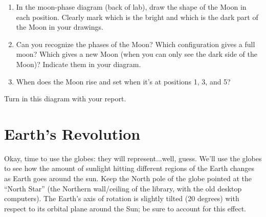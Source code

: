 \documentclass[11pt]{article}%
\begin{document}
\begin{enumerate}
    \item In the moon-phase diagram (back of lab), draw the shape of the Moon in each position. Clearly mark which is the bright and which is the dark part of the Moon in your drawings.
    \item Can you recognize the phases of the Moon? Which configuration gives a full moon? Which gives a new Moon (when you can only see the dark side of the Moon)? Indicate them in your diagram.
    \item When does the Moon rise and set when it's at positions 1, 3, and 5?
\end{enumerate}
Turn in this diagram with your report.

\section{Earth's Revolution}
Okay, time to use the globes: they will represent...well, guess. We'll use the globes to see how the amount of sunlight hitting different regions of the Earth changes as Earth goes around the sun. Keep the North pole of the globe pointed at the ``North Star'' (the Northern wall/ceiling of the library, with the old desktop computers). The Earth's axis of rotation is slightly tilted (20 degrees) with respect to its orbital plane around the Sun; be sure to account for this effect.
\end{document}

